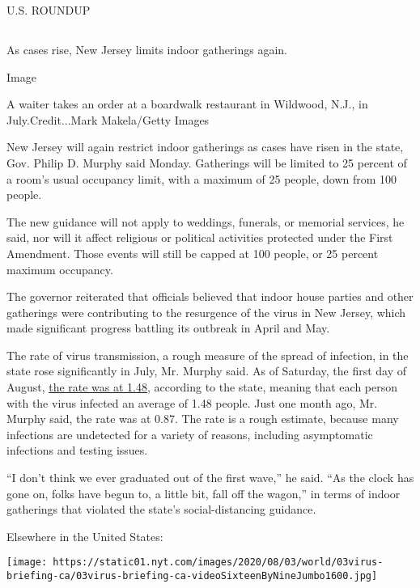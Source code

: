 U.S. ROUNDUP

\hypertarget{-10}{%
\subsection{}\label{-10}}

As cases rise, New Jersey limits indoor gatherings again.

Image

A waiter takes an order at a boardwalk restaurant in Wildwood, N.J., in
July.Credit...Mark Makela/Getty Images

New Jersey will again restrict indoor gatherings as cases have risen in
the state, Gov. Philip D. Murphy said Monday. Gatherings will be limited
to 25 percent of a room's usual occupancy limit, with a maximum of 25
people, down from 100 people.

The new guidance will not apply to weddings, funerals, or memorial
services, he said, nor will it affect religious or political activities
protected under the First Amendment. Those events will still be capped
at 100 people, or 25 percent maximum occupancy.

The governor reiterated that officials believed that indoor house
parties and other gatherings were contributing to the resurgence of the
virus in New Jersey, which made significant progress battling its
outbreak in April and May.

The rate of virus transmission, a rough measure of the spread of
infection, in the state rose significantly in July, Mr. Murphy said. As
of Saturday, the first day of August,
\href{https://twitter.com/GovMurphy/status/1290335172446097409/photo/2}{the
rate was at 1.48}, according to the state, meaning that each person with
the virus infected an average of 1.48 people. Just one month ago, Mr.
Murphy said, the rate was at 0.87. The rate is a rough estimate, because
many infections are undetected for a variety of reasons, including
asymptomatic infections and testing issues.

``I don't think we ever graduated out of the first wave,'' he said. ``As
the clock has gone on, folks have begun to, a little bit, fall off the
wagon,'' in terms of indoor gatherings that violated the state's
social-distancing guidance.

Elsewhere in the United States:

\texttt{[image: https://static01.nyt.com/images/2020/08/03/world/03virus-briefing-ca/03virus-briefing-ca-videoSixteenByNineJumbo1600.jpg]}

